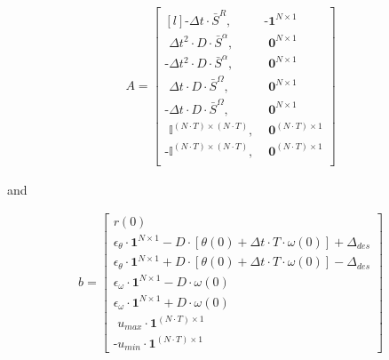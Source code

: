 \documentclass[letterpaper, 10 pt, conference]{ieeeconf}  %
\begin{document}
\begin{equation}
\begin{aligned}
A = 
\begin{bmatrix*}[l]
\text{-} \Delta t \cdot \bar{S}^R,  & \text{-} \mathbf{1}^{N \times 1} \\ 
\phantom{\text{-}} \Delta t^2 \cdot D \cdot \bar{S}^\alpha, & \phantom{\text{-}} \mathbf{0}^{N \times 1} \\
\text{-} \Delta t^2 \cdot D \cdot \bar{S}^\alpha, & \phantom{\text{-}} \mathbf{0}^{N \times 1} \\
\phantom{\text{-}} \Delta t \cdot D \cdot \bar{S}^\Omega, & \phantom{\text{-}} \mathbf{0}^{N \times 1} \\
\text{-} \Delta t \cdot D \cdot \bar{S}^\Omega, & \phantom{\text{-}} \mathbf{0}^{N \times 1} \\
\phantom{\text{-}} \mathbb{I}^{(N \cdot T) \times (N \cdot T)}, & \phantom{\text{-}} \mathbf{0}^{(N \cdot T) \times 1} \\
\text{-} \mathbb{I}^{(N \cdot T) \times (N \cdot T)}, & \phantom{\text{-}} \mathbf{0}^{(N \cdot T) \times 1} \\ 
\end{bmatrix*} 
\end{aligned}
\end{equation}

and

\begin{equation}
\begin{aligned}
b = 
\begin{bmatrix}
r(0) \\
\epsilon_{\theta} \cdot \mathbf{1}^{N \times 1} - D \cdot \left[ \theta (0) + \Delta t \cdot T \cdot \omega(0) \right] + \Delta_{des} \\
\epsilon_{\theta} \cdot \mathbf{1}^{N \times 1} + D \cdot \left[ \theta (0) + \Delta t \cdot T \cdot \omega(0) \right] - \Delta_{des} \\
\epsilon_{\omega} \cdot \mathbf{1}^{N \times 1} - D \cdot \omega (0) \\
\epsilon_{\omega} \cdot \mathbf{1}^{N \times 1} + D \cdot \omega (0) \\
\phantom{\text{-}} u_{max} \cdot \mathbf{1}^{(N \cdot T) \times 1} \\
{\text{-}} u_{min} \cdot \mathbf{1}^{(N \cdot T) \times 1} 
\end{bmatrix} 
\end{aligned} 
\end{equation}
\\
\end{document}
